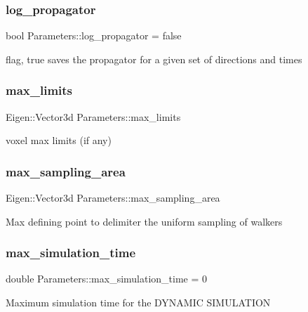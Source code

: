 \subsubsection{\texorpdfstring{log\+\_\+propagator}{log\_propagator}}
{\footnotesize\ttfamily bool Parameters\+::log\+\_\+propagator = false}

flag, true saves the propagator for a given set of directions and times \mbox{\label{class_parameters_a879b4c717e0f59c9bbc4b7810b8fdde3}} 
\subsubsection{\texorpdfstring{max\+\_\+limits}{max\_limits}}
{\footnotesize\ttfamily Eigen\+::\+Vector3d Parameters\+::max\+\_\+limits}

voxel max limits (if any) \mbox{\label{class_parameters_a2bf25423e72a562d5812ed0df3e06e2d}} 
\subsubsection{\texorpdfstring{max\+\_\+sampling\+\_\+area}{max\_sampling\_area}}
{\footnotesize\ttfamily Eigen\+::\+Vector3d Parameters\+::max\+\_\+sampling\+\_\+area}

Max defining point to delimiter the uniform sampling of walkers \mbox{\label{class_parameters_a66ad8359ef1cc76e8d5581a402cc86b5}} 
\subsubsection{\texorpdfstring{max\+\_\+simulation\+\_\+time}{max\_simulation\_time}}
{\footnotesize\ttfamily double Parameters\+::max\+\_\+simulation\+\_\+time = 0}

Maximum simulation time for the D\+Y\+N\+A\+M\+IC S\+I\+M\+U\+L\+A\+T\+I\+ON \mbox{\label{class_parameters_a0b44e239201caecaebdb7e956ead1e0c}} 
